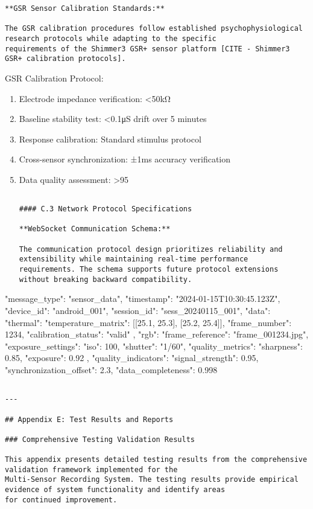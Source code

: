 \documentclass[11pt,a4paper]{article}
\begin{document}
{{\begin{itemize}
\begin{verbatim}
**GSR Sensor Calibration Standards:**

The GSR calibration procedures follow established psychophysiological research protocols while adapting to the specific
requirements of the Shimmer3 GSR+ sensor platform [CITE - Shimmer3 GSR+ calibration protocols].

\end{verbatim}
\end{itemize}
GSR Calibration Protocol:
\begin{enumerate}
\item Electrode impedance verification: <50kΩ
\item Baseline stability test: <0.1μS drift over 5 minutes
\item Response calibration: Standard stimulus protocol
\item Cross-sensor synchronization: ±1ms accuracy verification
\item Data quality assessment: >95%
\begin{verbatim}

#### C.3 Network Protocol Specifications

**WebSocket Communication Schema:**

The communication protocol design prioritizes reliability and extensibility while maintaining real-time performance
requirements. The schema supports future protocol extensions without breaking backward compatibility.

\end{verbatim}
\end{enumerate}
{
  "message\_type": "sensor\_data",
  "timestamp": "2024-01-15T10:30:45.123Z",
  "device\_id": "android\_001",
  "session\_id": "sess\_20240115\_001",
  "data": {
    "thermal": {
      "temperature\_matrix": [[25.1, 25.3], [25.2, 25.4]],
      "frame\_number": 1234,
      "calibration\_status": "valid"
    },
    "rgb": {
      "frame\_reference": "frame\_001234.jpg",
      "exposure\_settings": {"iso": 100, "shutter": "1/60"},
      "quality\_metrics": {"sharpness": 0.85, "exposure": 0.92}
    }
  },
  "quality\_indicators": {
    "signal\_strength": 0.95,
    "synchronization\_offset": 2.3,
    "data\_completeness": 0.998
  }
}
\begin{verbatim}

---

## Appendix E: Test Results and Reports

### Comprehensive Testing Validation Results

This appendix presents detailed testing results from the comprehensive validation framework implemented for the
Multi-Sensor Recording System. The testing results provide empirical evidence of system functionality and identify areas
for continued improvement.


\end{verbatim}}}
\end{document}
